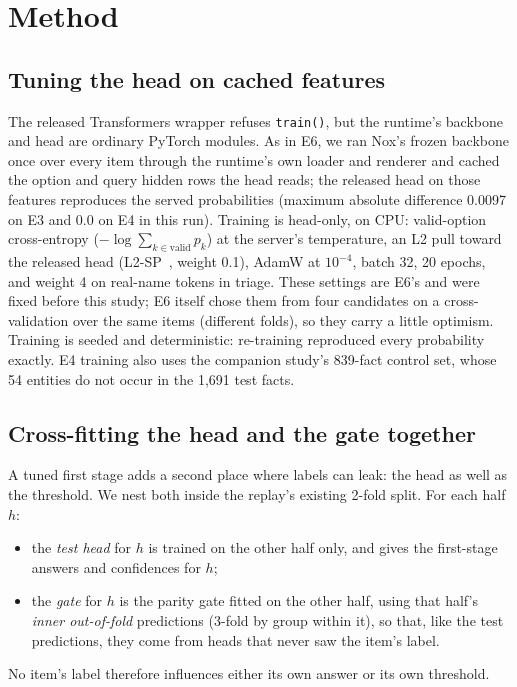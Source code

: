 \documentclass[11pt]{article}
\begin{document}
\section{Method}

\subsection{Tuning the head on cached features}
The released Transformers wrapper refuses \texttt{train()}, but the runtime's backbone and head are
ordinary PyTorch modules. As in E6, we ran Nox's frozen backbone once over every item through the
runtime's own loader and renderer and cached the option and query hidden rows the head reads; the
released head on those features reproduces the served probabilities (maximum absolute difference
0.0097 on E3 and 0.0 on E4 in this run). Training is head-only, on CPU: valid-option cross-entropy
($-\log\sum_{k\in\text{valid}}p_k$) at the server's temperature, an L2 pull toward the released head
(L2-SP~\cite{l2sp}, weight 0.1), AdamW at $10^{-4}$, batch 32, 20 epochs, and weight 4 on real-name tokens in
triage. These settings are E6's and were fixed before this study; E6 itself chose them from four
candidates on a cross-validation over the same items (different folds), so they carry a little
optimism. Training is seeded and deterministic: re-training reproduced every probability exactly.
E4 training also uses the companion study's 839-fact control set, whose 54 entities do not occur in
the 1{,}691 test facts.

\subsection{Cross-fitting the head and the gate together}
A tuned first stage adds a second place where labels can leak: the head as well as the threshold.
We nest both inside the replay's existing 2-fold split. For each half $h$:
\begin{itemize}
  \item the \emph{test head} for $h$ is trained on the other half only, and gives the first-stage
        answers and confidences for $h$;
  \item the \emph{gate} for $h$ is the parity gate fitted on the other half, using that half's
        \emph{inner out-of-fold} predictions (3-fold by group within it), so that, like the test
        predictions, they come from heads that never saw the item's label.
\end{itemize}
No item's label therefore influences either its own answer or its own threshold.
\end{document}
